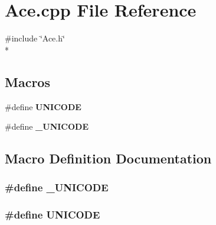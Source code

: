 \section{Ace.\+cpp File Reference}
\label{_ace_8cpp}
{\ttfamily \#include \char`\"{}Ace.\+h\char`\"{}}\\*
\subsection*{Macros}
\begin{DoxyCompactItemize}
\item 
\#define {\bf U\+N\+I\+C\+O\+DE}
\item 
\#define {\bf \+\_\+\+U\+N\+I\+C\+O\+DE}
\end{DoxyCompactItemize}


\subsection{Macro Definition Documentation}
\subsubsection[{\+\_\+\+U\+N\+I\+C\+O\+DE}]{\setlength{\rightskip}{0pt plus 5cm}\#define \+\_\+\+U\+N\+I\+C\+O\+DE}\label{_ace_8cpp_a78880e1abcefc90f14185aee93ad0e20}
\subsubsection[{U\+N\+I\+C\+O\+DE}]{\setlength{\rightskip}{0pt plus 5cm}\#define U\+N\+I\+C\+O\+DE}\label{_ace_8cpp_a09ecca53f2cd1b8d1c566bedb245e141}
